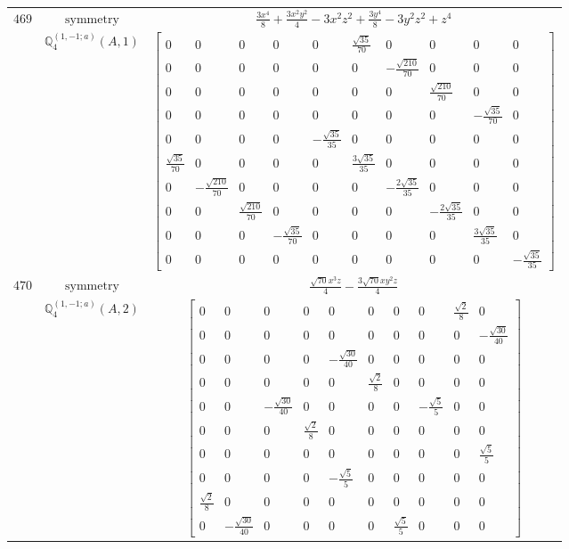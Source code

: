 \documentclass[fleqn,8pt,landscape]{jsarticle}
\begin{document}
\begin{longtable}{ccc}
$ 469 $ & $ \text{symmetry} $ & $ \frac{3 x^{4}}{8} + \frac{3 x^{2} y^{2}}{4} - 3 x^{2} z^{2} + \frac{3 y^{4}}{8} - 3 y^{2} z^{2} + z^{4} $ \\
$  $ & $ \mathbb{Q}_{4}^{(1,-1;a)}(A,1) $ & $ \begin{bmatrix} 0 & 0 & 0 & 0 & 0 & \frac{\sqrt{35}}{70} & 0 & 0 & 0 & 0 \\ 0 & 0 & 0 & 0 & 0 & 0 & - \frac{\sqrt{210}}{70} & 0 & 0 & 0 \\ 0 & 0 & 0 & 0 & 0 & 0 & 0 & \frac{\sqrt{210}}{70} & 0 & 0 \\ 0 & 0 & 0 & 0 & 0 & 0 & 0 & 0 & - \frac{\sqrt{35}}{70} & 0 \\ 0 & 0 & 0 & 0 & - \frac{\sqrt{35}}{35} & 0 & 0 & 0 & 0 & 0 \\ \frac{\sqrt{35}}{70} & 0 & 0 & 0 & 0 & \frac{3 \sqrt{35}}{35} & 0 & 0 & 0 & 0 \\ 0 & - \frac{\sqrt{210}}{70} & 0 & 0 & 0 & 0 & - \frac{2 \sqrt{35}}{35} & 0 & 0 & 0 \\ 0 & 0 & \frac{\sqrt{210}}{70} & 0 & 0 & 0 & 0 & - \frac{2 \sqrt{35}}{35} & 0 & 0 \\ 0 & 0 & 0 & - \frac{\sqrt{35}}{70} & 0 & 0 & 0 & 0 & \frac{3 \sqrt{35}}{35} & 0 \\ 0 & 0 & 0 & 0 & 0 & 0 & 0 & 0 & 0 & - \frac{\sqrt{35}}{35} \end{bmatrix} $ \\ \hline
$ 470 $ & $ \text{symmetry} $ & $ \frac{\sqrt{70} x^{3} z}{4} - \frac{3 \sqrt{70} x y^{2} z}{4} $ \\
$  $ & $ \mathbb{Q}_{4}^{(1,-1;a)}(A,2) $ & $ \begin{bmatrix} 0 & 0 & 0 & 0 & 0 & 0 & 0 & 0 & \frac{\sqrt{2}}{8} & 0 \\ 0 & 0 & 0 & 0 & 0 & 0 & 0 & 0 & 0 & - \frac{\sqrt{30}}{40} \\ 0 & 0 & 0 & 0 & - \frac{\sqrt{30}}{40} & 0 & 0 & 0 & 0 & 0 \\ 0 & 0 & 0 & 0 & 0 & \frac{\sqrt{2}}{8} & 0 & 0 & 0 & 0 \\ 0 & 0 & - \frac{\sqrt{30}}{40} & 0 & 0 & 0 & 0 & - \frac{\sqrt{5}}{5} & 0 & 0 \\ 0 & 0 & 0 & \frac{\sqrt{2}}{8} & 0 & 0 & 0 & 0 & 0 & 0 \\ 0 & 0 & 0 & 0 & 0 & 0 & 0 & 0 & 0 & \frac{\sqrt{5}}{5} \\ 0 & 0 & 0 & 0 & - \frac{\sqrt{5}}{5} & 0 & 0 & 0 & 0 & 0 \\ \frac{\sqrt{2}}{8} & 0 & 0 & 0 & 0 & 0 & 0 & 0 & 0 & 0 \\ 0 & - \frac{\sqrt{30}}{40} & 0 & 0 & 0 & 0 & \frac{\sqrt{5}}{5} & 0 & 0 & 0 \end{bmatrix} $ \\ \hline

\end{longtable}
\end{document}
